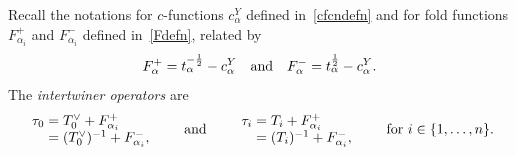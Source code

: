 \documentclass[11pt]{article}
\theoremstyle{plain}
\theoremstyle{definition}
\theoremstyle{remark}
\numberwithin{equation}{section}
\newcounter{r}
\newcounter{s}
\begin{document}
Recall the notations for $c$-functions $c^Y_{\alpha}$ defined in~\eqref{cfcndefn} and for fold functions $F^+_{\alpha_i}$ and $F^-_{\alpha_i}$ defined in~\eqref{Fdefn}, related by
\begin{equation*}
F_{\alpha}^+ = t_{\alpha}^{-\frac12} - c_{\alpha}^Y
\quad\hbox{and}\quad
F_{\alpha}^- = t_{\alpha}^{\frac12} - c_{\alpha}^Y.
\end{equation*}
The \emph{intertwiner operators} are
\begin{equation}
\begin{array}{r@{\;}c@{\;}l} 
\tau_{0} &=&  T_{0}^{\vee} + F^+_{\alpha_i}\\
&=& (T_{0}^{\vee})^{-1} +  F^-_{\alpha_i},
\end{array}
\qquad\text{and}\qquad
\begin{array}{r@{\;}c@{\;}l}
\tau_i &=& T_i + F^+_{\alpha_i} \\
&=& (T_i)^{-1} +  F^-_{\alpha_i},
\end{array}
\qquad\hbox{for $i\in \{1, \ldots, n\}$.}
\label{intdefn}
\end{equation}
\end{document}
